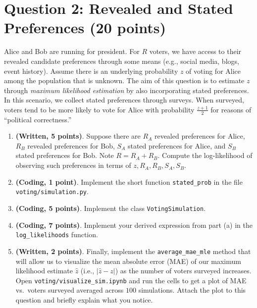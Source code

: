 \documentclass[
  letterpaper,
  DIV=11,
  numbers=noendperiod,
  oneside]{scrreprt}
\theoremstyle{remark}
\begin{document}
\section*{Question 2: Revealed and Stated Preferences (20
points)}\label{question-2-revealed-and-stated-preferences-20-points}


Alice and Bob are running for president. For \(R\) voters, we have
access to their revealed candidate preferences through some means (e.g.,
social media, blogs, event history). Assume there is an underlying
probability \(z\) of voting for Alice among the population that is
unknown. The aim of this question is to estimate \(z\) through
\emph{maximum likelihood estimation} by also incorporating stated
preferences. In this scenario, we collect stated preferences through
surveys. When surveyed, voters tend to be more likely to vote for Alice
with probability \(\frac{z+1}{2}\) for reasons of ``political
correctness.''

\begin{enumerate}
\def\labelenumi{(\alph{enumi})}
\item
  \textbf{(Written, 5 points)}. Suppose there are \(R_A\) revealed
  preferences for Alice, \(R_B\) revealed preferences for Bob, \(S_A\)
  stated preferences for Alice, and \(S_B\) stated preferences for Bob.
  Note \(R=R_A+R_B\). Compute the log-likelihood of observing such
  preferences in terms of \(z, R_A, R_B, S_A, S_B\).
\item
  \textbf{(Coding, 1 point)}. Implement the short function
  \texttt{stated\_prob} in the file \texttt{voting/simulation.py}.
\item
  \textbf{(Coding, 5 points)}. Implement the class
  \texttt{VotingSimulation}.
\item
  \textbf{(Coding, 7 points)}. Implement your derived expression from
  part (a) in the \texttt{log\_likelihoods} function.
\item
  \textbf{(Written, 2 points)}. Finally, implement the
  \texttt{average\_mae\_mle} method that will allow us to visualize the
  mean absolute error (MAE) of our maximum likelihood estimate
  \(\hat{z}\) (i.e., \(|\hat{z}-z|\)) as the number of voters surveyed
  increases. Open \texttt{voting/visualize\_sim.ipynb} and run the cells
  to get a plot of MAE vs.~voters surveyed averaged across \(100\)
  simulations. Attach the plot to this question and briefly explain what
  you notice.
\end{enumerate}
\end{document}
